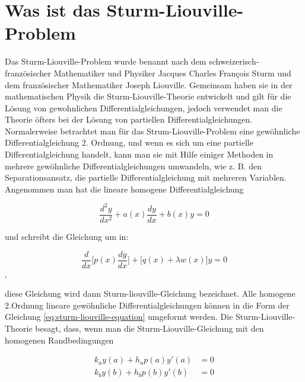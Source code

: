%
%
%
\section{Was ist das Sturm-Liouville-Problem\label{sturmliouville:section:teil0}}
Das Sturm-Liouville-Problem wurde benannt nach dem schweizerisch-französischer Mathematiker und Physiker Jacques Charles Fran\c{c}ois Sturm und dem französischer Mathematiker Joseph Liouville.
Gemeinsam haben sie in der mathematischen Physik die Sturm-Liouville-Theorie entwickelt und gilt für die Lösung von gewohnlichen Differentialgleichungen, jedoch verwendet man die Theorie öfters bei der Lösung von partiellen Differentialgleichungen.
Normalerweise betrachtet man für das Strum-Liouville-Problem eine gewöhnliche Differentialgleichung 2. Ordnung, und wenn es sich um eine partielle Differentialgleichung handelt, kann man sie mit Hilfe einiger Methoden in mehrere gewöhnliche Differentialgleichungen umwandeln, wie z. B. den Separationsansatz, die partielle Differentialgleichung mit mehreren Variablen.
Angenommen man hat die lineare homogene Differentialgleichung

\begin{equation}
	\frac{d^2y}{dx^2} + a(x)\frac{dy}{dx} + b(x)y = 0
\end{equation}

und schreibt die Gleichung um in:

\begin{equation}
	\label{eq:sturm-liouville-equation}
	\frac{d}{dx}\lbrack p(x) \frac{dy}{dx} \rbrack + \lbrack q(x) + \lambda w(x) \rbrack y = 0 
\end{equation},

diese Gleichung wird dann Sturm-liouville-Gleichung bezeichnet.
Alle homogene 2.Ordnung lineare gewöhnliche Differentialgleichungen können in die Form der Gleichung \ref{eq:sturm-liouville-equation} umgeformt werden.
Die Sturm-Liouville-Theorie besagt, dass, wenn man die Sturm-Liouville-Gleichung mit den homogenen Randbedingungen

\begin{equation}
\begin{aligned}
	\label{ali:randbedingungen}
	k_a y(a) + h_a p(a) y'(a) &= 0 \\
	k_b y(b) + h_b p(b) y'(b) &= 0
\end{aligned}
\end{equation}
 
